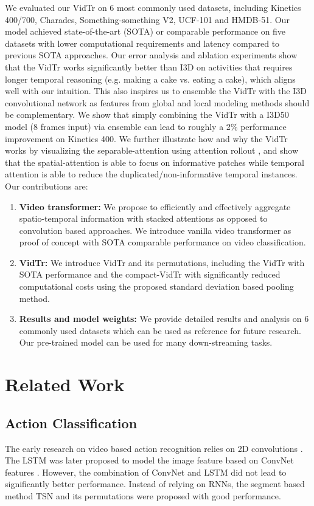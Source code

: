 \documentclass[10pt,twocolumn,letterpaper]{article}
\begin{document}
We evaluated our VidTr on 6 most commonly used datasets, including Kinetics 400/700, Charades, Something-something V2, UCF-101 and HMDB-51. Our model achieved state-of-the-art (SOTA) or comparable performance on five datasets with lower computational requirements and latency compared to previous SOTA approaches.  
Our error analysis and ablation experiments show that the VidTr works significantly better than I3D on activities that requires longer temporal reasoning (e.g. making a cake vs. eating a cake), which aligns well with our intuition. This also inspires us to ensemble the VidTr with the I3D convolutional network as features from global and local modeling methods should be complementary. 
We show that simply combining the VidTr with a I3D50 model (8 frames input) via ensemble  can lead to roughly a 2\% performance improvement on Kinetics 400.
We further illustrate how and why the VidTr works by visualizing the separable-attention using attention rollout \cite{abnar2020quantifying}, and show that the spatial-attention is able to focus on informative patches while temporal attention is able to reduce the duplicated/non-informative temporal instances. 
Our contributions are: 

\begin{enumerate}[itemsep=0pt,parsep=0pt]
\small
\item \textbf{Video transformer: } We propose to efficiently and effectively aggregate spatio-temporal information with stacked attentions as opposed to convolution based approaches. We introduce vanilla video transformer as proof of concept with SOTA comparable performance on video classification.
\item \textbf{VidTr: } We introduce VidTr and its permutations, including the VidTr with SOTA performance and the compact-VidTr with significantly reduced computational costs using the proposed standard deviation based pooling method.\item \textbf{Results and model weights: } We provide detailed results and analysis on 6 commonly used datasets which can be used as reference for future research. Our pre-trained model can be used for many down-streaming tasks. 
\end{enumerate} 
\section{Related Work}
\subsection{Action Classification}
The early research on video based action recognition relies on 2D convolutions \cite{karpathy2014large}. The LSTM \cite{hochreiter1997long} was later proposed to model the image feature based on ConvNet features \cite{yue2015beyond,ullah2017action,li2016action}. However, the combination of ConvNet and LSTM did not lead to significantly better performance. Instead of relying on RNNs, the segment based method TSN  \cite{wang_ECCV2016_TSN} and its permutations \cite{girdhar_CVPR2017_actionVLAD,Li_CVPR2016_VLAD3,zhou_ECCV2018_TRN} were proposed with good performance.
\end{document}
